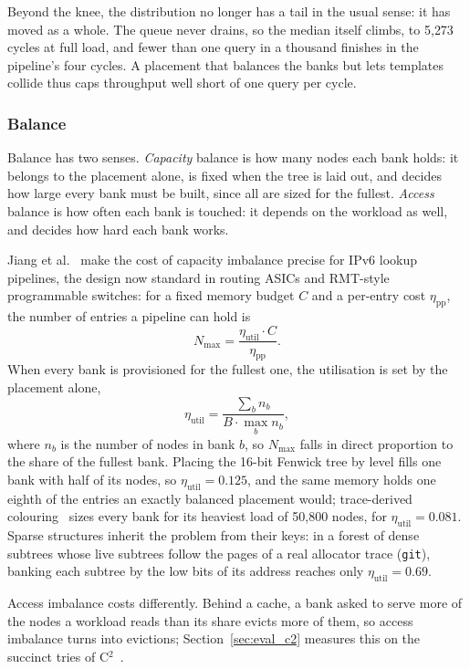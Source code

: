 Beyond the knee, the distribution no longer has a tail in the usual sense: it
has moved as a whole. The queue never drains, so the median itself climbs, to
	5{,}273 cycles at full load, and fewer than one query in a thousand finishes in
the pipeline's four cycles. A placement that balances the banks but lets
templates collide thus caps throughput well short of one query per cycle.

\subsubsection{Balance}
Balance has two senses. \emph{Capacity} balance is how many nodes each bank
holds: it belongs to the placement alone, is fixed when the tree is laid out,
and decides how large every bank must be built, since all are sized for the
fullest. \emph{Access} balance is how often each bank is touched: it depends on
the workload as well, and decides how hard each bank works.

Jiang et al.~\cite{jiang2026scamp} make the cost of capacity imbalance precise
for IPv6 lookup pipelines, the design now standard in routing ASICs and
RMT-style programmable switches: for a fixed memory budget $C$ and a per-entry
cost $\eta_{\mathrm{pp}}$, the number of entries a pipeline can hold is
$$
	N_{\mathrm{max}} = \frac{\eta_{\mathrm{util}} \cdot C}{\eta_{\mathrm{pp}}}.
$$
When every bank is provisioned for the fullest one, the utilisation is set by
the placement alone,
$$
	\eta_{\mathrm{util}} = \frac{\sum_b n_b}{B \cdot \max_b n_b},
$$
where $n_b$ is the number of nodes in bank $b$, so $N_{\mathrm{max}}$ falls in
direct proportion to the share of the fullest bank. Placing the 16-bit Fenwick
tree by level fills one bank with half of its nodes, so
$\eta_{\mathrm{util}} = 0.125$, and the same memory holds one eighth of the
entries an exactly balanced placement would; trace-derived
colouring~\cite{zhou2017new} sizes every bank for its heaviest load of 50,800
nodes, for $\eta_{\mathrm{util}} = 0.081$. Sparse structures inherit the
problem from their keys: in a forest of dense subtrees whose live subtrees
follow the pages of a real allocator trace (\texttt{git}), banking each subtree
by the low bits of its address reaches only $\eta_{\mathrm{util}} = 0.69$.

Access imbalance costs differently. Behind a cache, a bank asked to serve more
of the nodes a workload reads than its share evicts more of them, so access
imbalance turns into evictions; Section~\ref{sec:eval_c2} measures this on the
succinct tries of C$^2$~\cite{zhang2027c2}.
